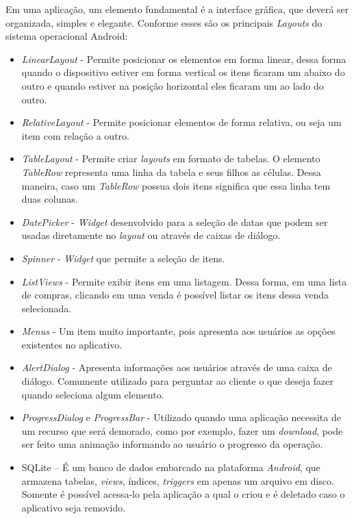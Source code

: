 	\par Em uma aplicação, um elemento fundamental é a interface gráfica, que
deverá ser organizada, simples e elegante. Conforme 
esses são os principais \textit{Layouts} do sistema operacional Android:
	\begin{itemize}
	
	 \item \textit{LinearLayout} - Permite posicionar os elementos em forma
	 linear, dessa forma quando o dispositivo estiver em forma vertical os itens
	 ficaram um abaixo do outro e quando estiver na posição horizontal eles
	 ficaram um ao lado do outro.
	
	  \item \textit{RelativeLayout} - Permite posicionar elementos de forma
	  relativa, ou seja um item com relação a outro.
	
	  \item \textit{TableLayout} - Permite criar \textit{layouts} em formato de
	  tabelas. O elemento \textit{TableRow} representa uma linha da tabela e seus
	  filhos as células.  Dessa maneira, caso um \textit{TableRow} possua dois
	  itens significa que essa linha tem duas colunas.
	
	  \item \textit{DatePicker} - \textit{Widget} desenvolvido para a seleção de
	  datas que podem ser usadas diretamente no \textit{layout} ou através de
	  caixas de diálogo.

	  \item \textit{Spinner} - \textit{Widget} que permite a seleção de itens. 
	
	  \item \textit{ListViews} - Permite exibir itens em uma listagem. Dessa
	  forma, em uma lista de compras, clicando em uma venda é possível listar os
	  itens dessa venda selecionada.
	
	  \item \textit{Menus} - Um item muito importante, pois apresenta aos usuários
	  as opções existentes no aplicativo.
	
	  \item \textit{AlertDialog} - Apresenta informações aos usuários através de
	  uma caixa de diálogo. Comumente utilizado para perguntar ao cliente o que
	  deseja fazer quando seleciona algum elemento.
	
	  \item \textit{ProgressDialog} e \textit{ProgressBar} - Utilizado quando uma
	  aplicação necessita de um recurso que será demorado, como por exemplo, fazer
	  um \textit{download}, pode ser feito uma animação informando ao usuário o
	  progresso da operação.
	  
	  \item SQLite – É um banco de dados embarcado na plataforma \textit{Android},
	  que armazena tabelas, \textit{views}, índices, \textit{triggers} em apenas um
	  arquivo em disco. Somente é possível acessa-lo pela aplicação a qual o criou
	  e é deletado caso o aplicativo seja removido.

	\end{itemize}
	
